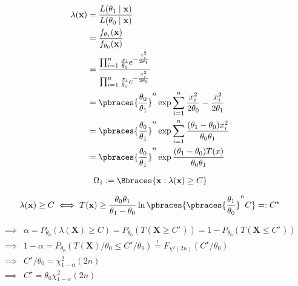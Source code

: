 \begin{solution}
\begin{enumerate}[label = (\alph*)]
    \begin{align*}
        \lambda(\mathbf x)
        & =
        \frac
        {
            L(\theta_1 \mid \mathbf x)
        }{
            L(\theta_0 \mid \mathbf x)
        } \\
        & =
        \frac
        {
            f_{\theta_1}(\mathbf x)
        }{
            f_{\theta_0}(\mathbf x)
        } \\
        & =
        \frac
        {
            \prod_{i=1}^n
                \frac{x_i}{\theta_1}
                e^{-\frac{x_i^2}{2 \theta_1}}
        }{
            \prod_{i=1}^n
                \frac{x_i}{\theta_0}
                e^{-\frac{x_i^2}{2 \theta_0}}
        } \\
        & =
        \pbraces{\frac{\theta_0}{\theta_1}}^n
        \exp \sum_{i=1}^n \frac{x_i^2}{2 \theta_0} - \frac{x_i^2}{2 \theta_1} \\
        & =
        \pbraces{\frac{\theta_0}{\theta_1}}^n
        \exp \sum_{i=1}^n \frac{(\theta_1 - \theta_0) x_i^2}{\theta_0 \theta_1} \\
        & =
        \pbraces{\frac{\theta_0}{\theta_1}}^n
        \exp \frac{(\theta_1 - \theta_0) T(x)}{\theta_0 \theta_1}
    \end{align*}

    \begin{align*}
        \Omega_1
        :=
        \Bbraces{\mathbf x: \lambda(\mathbf x) \geq C}
    \end{align*}

    \begin{align*}
        \lambda(\mathbf x) \geq C
        \iff
        T(\mathbf x) \geq \frac{\theta_0 \theta_1}{\theta_1 - \theta_0} \ln \pbraces{\pbraces{\frac{\theta_1}{\theta_0}}^n C} =: C^\star
    \end{align*}

    \begin{align*}
        \implies &
        \alpha = P_{\theta_0}(\lambda(\mathbf X) \geq C) = P_{\theta_0}(T(\mathbf X \geq C^\star)) = 1 - P_{\theta_0}(T(\mathbf X \leq C^\star)) \\
        \implies &
        1 - \alpha = P_{\theta_0}(T(\mathbf X) / \theta_0 \leq C^\star / \theta_0) \stackrel{!}{=} F_{\chi^2(2 n)}(C^\star / \theta_0) \\
        \implies &
        C^\star / \theta_0 = \chi^2_{1 - \alpha}(2 n) \\
        \implies &
        C^\star = \theta_0 \chi^2_{1 - \alpha}(2 n)
    \end{align*}


\end{enumerate}
\end{solution}
